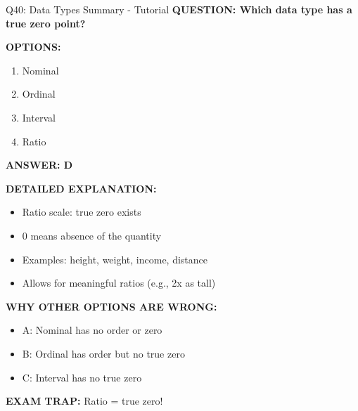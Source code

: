 \documentclass[8pt]{beamer}
\begin{document}
	\begin{frame}{Q40: Data Types Summary - Tutorial}
		\fontsize{6.5}{7.5}\selectfont
		\textbf{QUESTION: Which data type has a true zero point?}
		
		\vspace{0.1cm}
		\textbf{OPTIONS:}
		\begin{enumerate}
			\item Nominal
			\item Ordinal
			\item Interval
			\item Ratio
		\end{enumerate}
		
		\vspace{0.1cm}
		\textcolor{myblue}{\textbf{ANSWER: D}}
		
		\vspace{0.1cm}
		\textbf{DETAILED EXPLANATION:}
		\begin{itemize}
			\item Ratio scale: true zero exists
			\item 0 means absence of the quantity
			\item Examples: height, weight, income, distance
			\item Allows for meaningful ratios (e.g., 2x as tall)
		\end{itemize}
		
		\vspace{0.1cm}
		\textcolor{myred}{\textbf{WHY OTHER OPTIONS ARE WRONG:}}
		\begin{itemize}
			\item \textcolor{myred}{A:} Nominal has no order or zero
			\item \textcolor{myred}{B:} Ordinal has order but no true zero
			\item \textcolor{myred}{C:} Interval has no true zero
		\end{itemize}
		
		\textcolor{myred}{\textbf{EXAM TRAP:}} Ratio = \textcolor{myblue}{true zero}!
	\end{frame}
	
	
\end{document}
